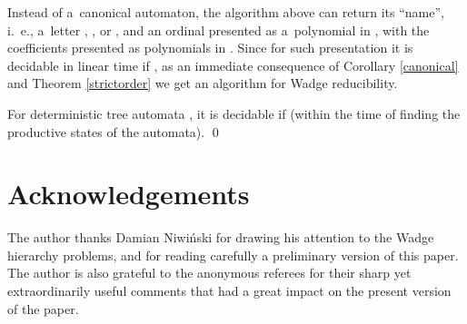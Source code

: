 \documentclass{LMCS}
\begin{document}
Instead of a~canonical automaton, the algorithm above can return its
``name'', i.~e., a~letter , , or , and an ordinal
 presented as a~polynomial in
, with the coefficients presented as polynomials in
. Since for such presentation it is decidable in linear time
if , as an immediate consequence of Corollary
\ref{canonical} and Theorem \ref{strictorder} we get an algorithm for Wadge reducibility.

\begin{cor} 
For deterministic tree automata ,  it is decidable if  (within the time of finding the productive states of the automata). \qed
\end{cor}


\section*{Acknowledgements}

The author thanks Damian Niwi\'nski for drawing his attention to the Wadge hierarchy problems, and for reading carefully a preliminary version of this paper. The author is also grateful to the anonymous referees for their sharp yet extraordinarily useful comments that had a great impact on the present version of the paper. 
\end{document}
